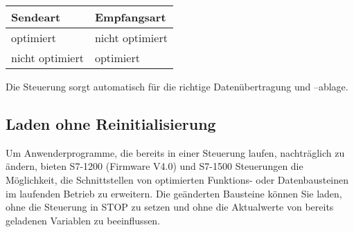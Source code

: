 \begin{longtable}{| p{} | p{} |} %
    \hline
    \textbf{Sendeart} & \textbf{Empfangsart}\\    
    \hline
    optimiert & nicht optimiert\\    
    \hline
    nicht optimiert & optimiert\\    
    \hline
    
\end{longtable}
\noindent Die Steuerung sorgt automatisch für die richtige Datenübertragung und –ablage.


\subsection{Laden ohne Reinitialisierung}\label{subsec:Laden ohne Reinitialisierung}
Um Anwenderprogramme, die bereits in einer Steuerung laufen, nachträglich zu ändern, bieten S7-1200 (Firmware V4.0) und S7-1500 Steuerungen die Möglichkeit, die Schnittstellen von optimierten Funktions- oder Datenbausteinen im laufenden Betrieb zu erweitern. Die geänderten Bausteine können Sie laden, ohne die Steuerung in STOP zu setzen und ohne die Aktualwerte von bereits geladenen Variablen zu beeinflussen.